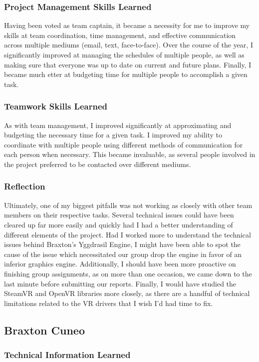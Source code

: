 \documentclass[onecolumn, draftclsnofoot,10pt, compsoc]{IEEEtran}
\begin{document}
\subsubsection{Project Management Skills Learned}
Having been voted as team captain, it became a necessity for me to improve my skills at team coordination, time management, and effective communication across multiple mediums (email, text, face-to-face). Over the course of the year, I significantly improved at managing the schedules of multiple people, as well as making sure that everyone was up to date on current and future plans. Finally, I became much etter at budgeting time for multiple people to accomplish a given task.
\subsubsection{Teamwork Skills Learned}
As with team management, I improved significantly at approximating and budgeting the necessary time for a given task. I improved my ability to coordinate with multiple people using different methods of communication for each person when necessary. This became invaluable, as several people involved in the project preferred to be contacted over different mediums.
\subsubsection{Reflection}
Ultimately, one of my biggest pitfalls was not working as closely with other team members on their respective tasks. Several technical issues could have been cleared up far more easily and quickly had I had a better understanding of different elements of the project. Had I worked more to understand the technical issues behind Braxton's Yggdrasil Engine, I might have been able to spot the cause of the issue which necessitated our group drop the engine in favor of an inferior graphics engine. Additionally, I should have been more proactive on finishing group assignments, as on more than one occasion, we came down to the last minute before submitting our reports. Finally, I would have studied the SteamVR and OpenVR libraries more closely, as there are a handful of technical limitations related to the VR drivers that I wish I'd had time to fix.


\subsection{Braxton Cuneo}

\subsubsection{Technical Information Learned}
\end{document}
